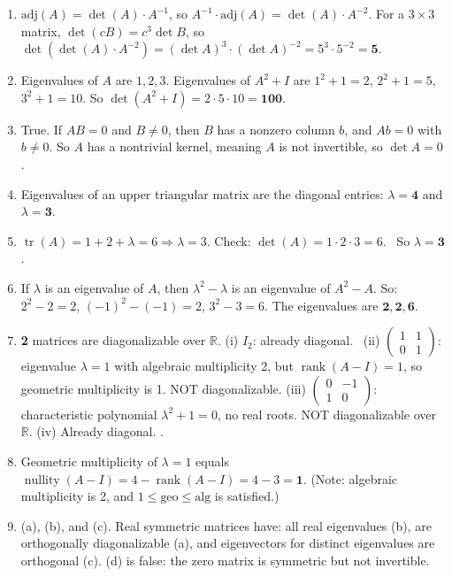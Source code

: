 \documentclass[11pt]{article}
\DeclareMathOperator{\tr}{tr}
\DeclareMathOperator{\rank}{rank}
\DeclareMathOperator{\nullity}{nullity}
\begin{document}
\begin{enumerate}
\item $\text{adj}(A)=\det(A)\cdot A^{-1}$, so $A^{-1}\cdot\text{adj}(A)=\det(A)\cdot A^{-2}$. For a $3\times 3$ matrix, $\det(cB)=c^3\det B$, so $\det(\det(A)\cdot A^{-2})=(\det A)^3\cdot(\det A)^{-2}=5^3\cdot 5^{-2}=\mathbf{5}$.

\item Eigenvalues of $A$ are $1,2,3$. Eigenvalues of $A^2+I$ are $1^2+1=2$, $2^2+1=5$, $3^2+1=10$. So $\det(A^2+I)=2\cdot 5\cdot 10=\mathbf{100}$.

\item True. If $AB=0$ and $B\neq 0$, then $B$ has a nonzero column $b$, and $Ab=0$ with $b\neq 0$. So $A$ has a nontrivial kernel, meaning $A$ is not invertible, so $\det A=0$.

\item Eigenvalues of an upper triangular matrix are the diagonal entries: $\lambda=\mathbf{4}$ and $\lambda=\mathbf{3}$.

\item $\tr(A)=1+2+\lambda=6\Rightarrow\lambda=3$. Check: $\det(A)=1\cdot 2\cdot 3=6$. \checkmark\ So $\lambda=\mathbf{3}$.

\item If $\lambda$ is an eigenvalue of $A$, then $\lambda^2-\lambda$ is an eigenvalue of $A^2-A$. So: $2^2-2=2$, $(-1)^2-(-1)=2$, $3^2-3=6$. The eigenvalues are $\mathbf{2, 2, 6}$.

\item \textbf{2} matrices are diagonalizable over $\mathbb{R}$. (i) $I_2$: already diagonal. \checkmark\ (ii) $\begin{pmatrix}1&1\\0&1\end{pmatrix}$: eigenvalue $\lambda=1$ with algebraic multiplicity 2, but $\rank(A-I)=1$, so geometric multiplicity is 1. NOT diagonalizable. (iii) $\begin{pmatrix}0&-1\\1&0\end{pmatrix}$: characteristic polynomial $\lambda^2+1=0$, no real roots. NOT diagonalizable over $\mathbb{R}$. (iv) Already diagonal. \checkmark.

\item Geometric multiplicity of $\lambda=1$ equals $\nullity(A-I)=4-\rank(A-I)=4-3=\mathbf{1}$. (Note: algebraic multiplicity is 2, and $1\le\text{geo}\le\text{alg}$ is satisfied.)

\item (a), (b), and (c). Real symmetric matrices have: all real eigenvalues (b), are orthogonally diagonalizable (a), and eigenvectors for distinct eigenvalues are orthogonal (c). (d) is false: the zero matrix is symmetric but not invertible.


\end{enumerate}
\end{document}
